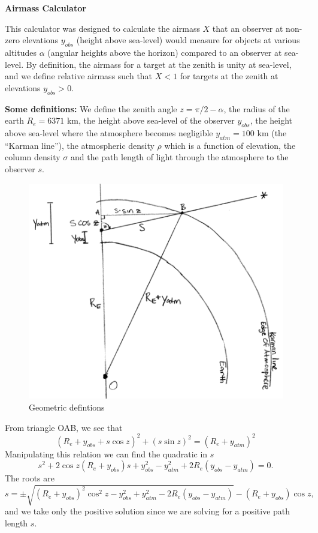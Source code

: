 \documentclass[a4paper]{article}
\newcommand{\yobs}{y_{obs}}
\newcommand{\yatm}{y_{atm}}
\begin{document}
\begin{center}
\bf \large Airmass Calculator
\end{center}

This calculator was designed to calculate the airmass $X$ that an observer at non-zero elevations $\yobs$ (height above sea-level) would measure for objects at various altitudes $\alpha$ (angular heights above the horizon) compared to an observer at sea-level. By definition, the airmass for a target at the zenith is unity at sea-level, and we define relative airmass such that $X < 1$ for targets at the zenith at elevations $\yobs > 0$. 

{\bf Some definitions:} We define the zenith angle $z = \pi/2 - \alpha$, the radius of the earth $R_e = 6371$ km, the height above sea-level of the observer $\yobs$, the height above sea-level where the atmosphere becomes negligible $\yatm = 100$ km (the ``Karman line''), the atmospheric density $\rho$ which is a function of elevation,  the column density $\sigma$ and the path length of light through the atmosphere to the observer $s$. 

\begin{figure}[H]
\begin{center}
\includegraphics[scale=0.34]{figs/diagram.png}
\caption{Geometric defintions}
\end{center}
\end{figure}

From triangle OAB, we see that 
\begin{equation}
(R_e + \yobs + s \cos z )^2 + (s \sin z)^2 = (R_e + \yatm)^2
\end{equation}
Manipulating this relation we can find the quadratic in $s$
\begin{equation}
s^2 + 2 \cos z (R_e + \yobs) s + \yobs^2 - \yatm^2 + 2R_e(\yobs-\yatm) = 0.
\end{equation}
The roots are 
\begin{equation}
s = \pm \sqrt{ (R_e + \yobs)^2\cos^2 z - \yobs^2 + \yatm^2 - 2R_e(\yobs-\yatm)} - (R_e + \yobs)\cos z \label{eqn:s}, 
\end{equation}
and we take only the positive solution since we are solving for a positive path length $s$. 
\end{document}
